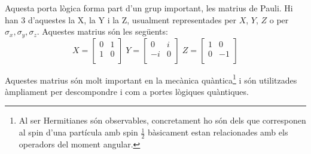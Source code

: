 Aquesta porta lògica forma part d'un grup important, les matrius de Pauli. Hi han 3 d'aquestes la X, la Y i la Z, usualment representades per $X$, $Y$, $Z$ o per $\sigma_x, \sigma_y, \sigma_z$. Aquestes matrius són les següents:
$$
	 X = \begin{bmatrix} 0 & 1\\ 1 & 0\\ \end{bmatrix} \; Y = \begin{bmatrix} 0 & i\\ -i & 0\\ \end{bmatrix} \; Z = \begin{bmatrix} 1 & 0\\ 0 & -1\\ \end{bmatrix} 
$$

Aquestes matrius són molt important en la mecànica quàntica\footnote{Al ser Hermitianes són observables, concretament ho són dels que corresponen al spin d'una partícula amb spin $\frac{1}{2}$ bàsicament estan relacionades amb els operadors del moment angular.} i són utilitzades àmpliament per descompondre i com a portes lògiques quàntiques.

